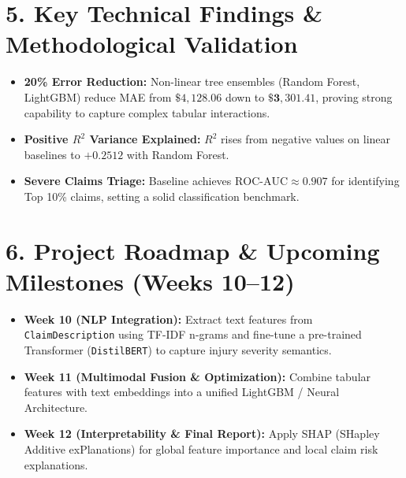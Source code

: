 \documentclass[10pt,a4paper]{article}
\begin{document}
\section{5. Key Technical Findings \& Methodological Validation}
\begin{itemize}
    \item \textbf{20\% Error Reduction:} Non-linear tree ensembles (Random Forest, LightGBM) reduce MAE from $\$4{,}128.06$ down to $\mathbf{\$3{,}301.41}$, proving strong capability to capture complex tabular interactions.
    \item \textbf{Positive $R^2$ Variance Explained:} $R^2$ rises from negative values on linear baselines to $\mathbf{+0.2512}$ with Random Forest.
    \item \textbf{Severe Claims Triage:} Baseline achieves $\text{ROC-AUC} \approx 0.907$ for identifying Top 10\% claims, setting a solid classification benchmark.
\end{itemize}

\section{6. Project Roadmap \& Upcoming Milestones (Weeks 10--12)}
\begin{itemize}
    \item \textbf{Week 10 (NLP Integration):} Extract text features from \texttt{ClaimDescription} using TF-IDF n-grams and fine-tune a pre-trained Transformer (\texttt{DistilBERT}) to capture injury severity semantics.
    \item \textbf{Week 11 (Multimodal Fusion \& Optimization):} Combine tabular features with text embeddings into a unified LightGBM / Neural Architecture.
    \item \textbf{Week 12 (Interpretability \& Final Report):} Apply SHAP (SHapley Additive exPlanations) for global feature importance and local claim risk explanations.
\end{itemize}
\end{document}
